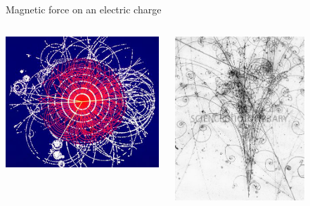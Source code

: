 \begin{frame}{Magnetic force on an electric charge}
\begin{columns}
  \begin{column}{0.30\textwidth}
    \begin{center}
      \includegraphics[width=0.99\textwidth]{./images/misc/atlas_event.jpg}\\
    \end{center}
  \end{column}
  \begin{column}{0.30\textwidth}
    \begin{center}
      \includegraphics[width=0.70\textwidth]{./images/misc/em_particle_shower.jpg}\\

\end{center}
\end{column}
\end{columns}
\end{frame}
